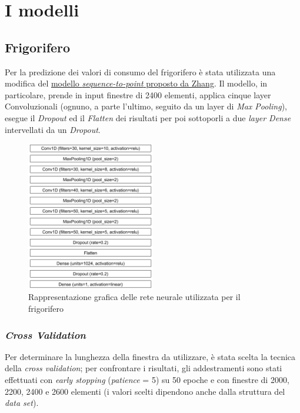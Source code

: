 \documentclass[12pt,a4paper,fleqn]{article}
\begin{document}
\section{I modelli}

\subsection{Frigorifero}
Per la predizione dei valori di consumo del frigorifero è stata utilizzata una modifica del \href{https://arxiv.org/abs/1612.09106}{modello \textsl{sequence-to-point} proposto da Zhang}.
Il modello, in particolare, prende in input finestre di 2400 elementi, applica cinque layer Convoluzionali (ognuno, a parte l'ultimo, seguito da un layer di \textsl{Max Pooling}), esegue il \textsl{Dropout} ed il \textsl{Flatten} dei risultati per poi sottoporli a due \textsl{layer Dense} intervellati da un \textsl{Dropout}.

\begin{figure}
\centering
\includegraphics[width=0.5\textwidth]{images/fridge.png}
\caption{Rappresentazione grafica delle rete neurale utilizzata per il frigorifero}
\label{fig:frigorifero}
\end{figure}

\subsubsection{\textsl{Cross Validation}}
Per determinare la lunghezza della finestra da utilizzare, è stata scelta la tecnica della \textsl{cross validation}; per confrontare i risultati, gli addestramenti sono stati effettuati con \textsl{early stopping} (\textsl{patience} = 5) su 50 epoche e con finestre di 2000, 2200, 2400 e 2600 elementi (i valori scelti dipendono anche dalla struttura del \textsl{data set}).
\end{document}

